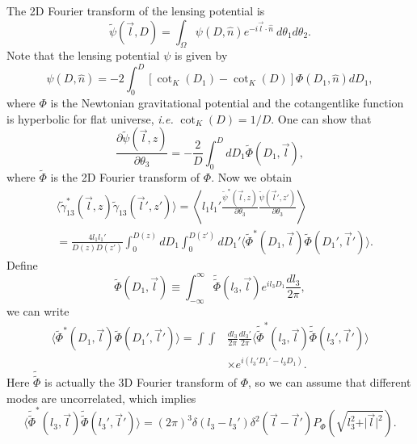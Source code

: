 \documentclass[aps,prd,twocolumn,floatfix,showpacs,superscriptaddress,nofootinbib]{revtex4-1}
\newcommand{\ie}{{\it i.e. }}
\begin{document}
The 2D Fourier transform of the lensing potential is
\begin{equation}
\tilde{\psi}(\vec{l},D)=\int_\Omega\psi(D,\hat{n})e^{-i\vec{l}\cdot\hat{n}}\ d\theta_1 d\theta_2.
\label{potentialFourier}
\end{equation}
Note that the lensing potential $\psi$ is given by
\begin{equation}
\psi(D,\hat{n})=
-2\int_0^{D}[\cot_K(D_1)-\cot_K(D)]\Phi(D_1,\hat{n})dD_1,
\label{lensingpotential}
\end{equation}
where $\Phi$ is the Newtonian gravitational potential and the cotangentlike function is hyperbolic for flat universe, \ie $\cot_K(D)=1/D$. One can show that
\begin{equation}
\frac{\partial\tilde{\psi}(\vec{l},z)}{\partial\theta_3}=-\frac{2}{D}\int_0^D dD_1\tilde{\Phi}(D_1,\vec{l}),
\end{equation}
where $\tilde{\Phi}$ is the 2D Fourier transform of $\Phi$. Now we obtain
\begin{align}
&\langle\tilde{\gamma}_{13}^*(\vec{l},z)\tilde{\gamma}_{13}(\vec{l}',z')\rangle=\left\langle l_1l_1'\frac{\tilde{\psi}^*(\vec{l},z)}{\partial\theta_3}\frac{\tilde{\psi}(\vec{l}',z')}{\partial\theta_3}\right\rangle\nonumber\\
&=\frac{4l_1l_1'}{D(z)D(z')}\int_0^{D(z)}dD_1\int_0^{D(z')}dD_1'\langle\tilde{\Phi}^*(D_1,\vec{l})\tilde{\Phi}(D_1',\vec{l}')\rangle.
\end{align}
Define
\begin{equation}
\tilde{\Phi}(D_1,\vec{l})\equiv\int_{-\infty}^{\infty}\tilde{\tilde{\Phi}}(l_3,\vec{l})e^{il_3D_1}\frac{dl_3}{2\pi},
\end{equation}
we can write
\begin{align}
\langle\tilde{\Phi}^*(D_1,\vec{l})\tilde{\Phi}(D_1',\vec{l}')\rangle=\int\int&\frac{dl_3}{2\pi}\frac{dl_3'}{2\pi}\langle\tilde{\tilde{\Phi}}^*(l_3,\vec{l})\tilde{\tilde{\Phi}}(l_3',\vec{l}')\rangle\nonumber\\
&\times e^{i(l_3'D_1'-l_3D_1)}. \label{eq:doubletilde}
\end{align}
Here $\tilde{\tilde{\Phi}}$ is actually the 3D Fourier transform of $\Phi$, so we can assume that different modes are uncorrelated, which implies
\begin{equation}
\langle\tilde{\tilde{\Phi}}^*(l_3,\vec{l})\tilde{\tilde{\Phi}}(l_3',\vec{l}')\rangle=(2\pi)^3\delta(l_3-l_3')\delta^2(\vec{l}-\vec{l}')P_{\Phi}(\sqrt{l_3^2+\vert\vec{l}\vert^2}).
\end{equation}
\end{document}
